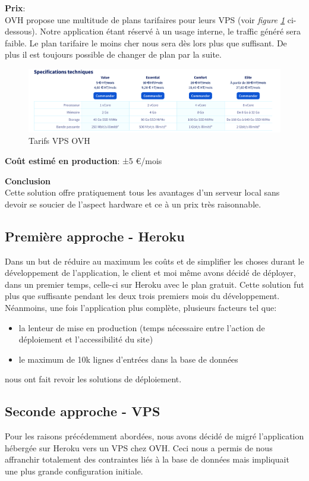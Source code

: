 \newpara
\textbf{Prix}: \\ OVH propose une multitude de plans tarifaires pour leurs VPS (voir \textit{figure \ref{ovh-pricing}} ci-dessous). Notre application étant réservé à un usage interne, le traffic généré sera faible. Le plan tarifaire le moins cher nous sera dès lors plus que suffisant. De plus il est toujours possible de changer de plan par la suite. 
\begin{figure}[H]
  \centering
  \includegraphics[width=\linewidth]{img/vps-tarifs.png}
  \caption{Tarifs VPS OVH}
  \label{ovh-pricing}
\end{figure}



\newpara
\textbf{Coût estimé en production}: ±5 €/mois

\newpara
\textbf{Conclusion} \\ Cette solution offre pratiquement tous les avantages d'un serveur local sans devoir se soucier de l'aspect hardware et ce à un prix très raisonnable. 

\newpage
\subsection{Première approche - Heroku}
Dans un but de réduire au maximum les coûts et de simplifier les choses durant le développement de l'application, le client et moi même avons décidé de déployer, dans un premier temps, celle-ci sur Heroku avec le plan gratuit. Cette solution fut plus que suffisante pendant les deux trois premiers mois du développement. Néanmoins, une fois l'application plus complète, plusieurs facteurs tel que: 
\begin{itemize}
  \item la lenteur de mise en production (temps nécessaire entre l'action de déploiement et l'accessibilité du site)
  \item le maximum de 10k lignes d'entrées dans la base de données 
\end{itemize}
nous ont fait revoir les solutions de déploiement. 

\subsection{Seconde approche - VPS}
Pour les raisons précédemment abordées, nous avons décidé de migré l'application hébergée sur Heroku vers un VPS chez OVH. Ceci nous a permis de nous affranchir totalement des contraintes liés à la base de données mais impliquait une plus grande configuration initiale. 

